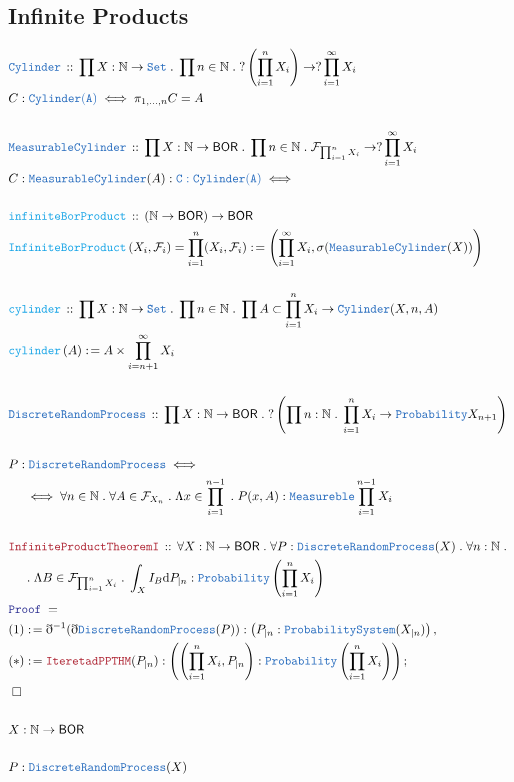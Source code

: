 \documentclass[12pt]{scrartcl}
\newcommand{\TYPE}[1]{\textcolor{NavyBlue}{\mathtt{#1}}}
\newcommand{\FUNC}[1]{\textcolor{Cerulean}{\mathtt{#1}}}
\newcommand{\LOGIC}[1]{\textcolor{Blue}{\mathtt{#1}}}
\newcommand{\THM}[1]{\textcolor{Maroon}{\mathtt{#1}}}
\renewcommand{\.}{\; . \;}
\newcommand{\de}{: \kern 0.1pc =}
\newcommand{\Act}[1]{\left( #1 \right)}
\newcommand{\Theorem}[2]{& \THM{#1} \, :: \, #2 \\ & \Proof = \\ }
\newcommand{\DeclareType}[2]{& \TYPE{#1} \, :: \, #2 \\}
\newcommand{\DefineType}[3]{& #1 : \TYPE{#2} \iff #3 \\}
\newcommand{\DeclareFunc}[2]{& \FUNC{#1} \, :: \, #2 \\}
\newcommand{\DefineFunc}[3]{&  \FUNC{#1}\Act{#2} \de #3 \\}
\newcommand{\DefineNamedFunc}[4]{&  \FUNC{#1}\Act{#2} = #3 \de #4 \\}
\newcommand{\NewLine}{\\ & \kern 1pc}
\newcommand{\ForEach}[3]{\forall #1 : #2 \. #3 }
\newcommand{\Nat}{\mathbb{N} }
\newcommand{\Set}{\TYPE{Set}}
\newcommand{\Say}[3]{& #1 \de #2 : #3, \\}
\newcommand{\Conclude}[3]{& #1 \de #2 : #3; \\}
\newcommand{\QED}{\; \square}
\newcommand{\EndProof}{& \QED \\}
\newcommand{\ByDef}{\eth}
\newcommand{\Proof}{\LOGIC{Proof} \; }
\newcommand{\DRP}{\TYPE{DiscreteRandomProcess}}
\newcommand{\BOR}{\mathsf{BOR}}
\newcommand{\F}{\mathcal{F}}
\begin{document}
\subsection{Infinite Products}
\begin{align*}
\DeclareType{Cylinder}{ \prod X : \Nat \to \Set \. \prod n \in \Nat \. 
?\left(\prod^n_{i=1} X_{i}\right) \to ?\prod^\infty_{i=1}  X_i }
\DefineType{ C }{ \TYPE{Cylinder}(A) }{ \pi_{1,\ldots,n} C = A }
\\ 
\DeclareType{MeasurableCylinder}{ \prod X : \Nat \to \BOR \.\prod n \in \Nat \.  \F_{\prod^n_{i=1}X_i} \to ?\prod^\infty_{i=1} X_i }
\DefineType{ C : \TYPE{MeasurableCylinder}(A) }{  C : \TYPE{Cylinder}(A) }
\\ 
\DeclareFunc{infiniteBorProduct}{ (\Nat \to \BOR) \to \BOR }
\DefineNamedFunc{InfiniteBorProduct}{X_i, \F_i}{\prod^n_{i=1} (X_i,\F_i)}{ \left( \prod^\infty_{i = 1} X_i, \sigma( \TYPE{MeasurableCylinder}(X) ) \right)}
\\ 
\DeclareFunc{cylinder}{ \prod X : \Nat \to \Set \. \prod n \in \Nat \.  \prod A \subset \prod^n_{i = 1} X_i \to  \TYPE{Cylinder}(X,n,A) }
\DefineFunc{cylinder}{ A  }{ A \times \prod^\infty_{i = n + 1} X_i }
\\ 
\DeclareType{DiscreteRandomProcess}{ \prod  X :  \Nat \to \BOR \. ?\left( \prod n : \Nat \.    \prod^n_{i = 1} X_i \to 
\TYPE{Probability}  X_{n + 1}  \right)  } \\
\DefineType{ P} { \DRP }
{ \NewLine \iff \forall n \in \Nat \.  \forall A \in \F_{ X_n } \. 
 \Lambda x \in \prod^{ n - 1}_{i = 1} \.  P(x,A) : \TYPE{Measureble} \prod^{n - 1}_{i = 1 }X_i }
\\
\Theorem{InfiniteProductTheoremI}{ 
\ForEach{ X}{ \Nat \to \BOR }{ 
\ForEach{P}{\DRP(X)}{
\ForEach{n}{\Nat}{  \NewLine \.
\Lambda B \in \F_{ \prod^n_{i=1} X_i  } \.  \int_{X} I_{B} \mathrm{d}P_{|n} : \TYPE{Probability}\left( \prod^n_{i = 1 } X_i \right) 
} } } }
\Say{(1)}{\ByDef^{-1}( \ByDef \DRP  (P) )}{ \left( P_{|n} : \TYPE{ProbabilitySystem}( X_{|n}) \right)}
\Conclude{(*)}{\THM{IteretadPPTHM}( P_{|n} ) }{ \left( \left( \prod^n_{i = 1} X_i, P_{|n}  \right)  : \TYPE{Probability}\left(  \prod^n_{i = 1} X_i   \right) \right) } 
\EndProof
\\
& X : \Nat \to \BOR 
\\ \\
& P : \DRP(X) 
\end{align*}
\newpage
\end{document}
